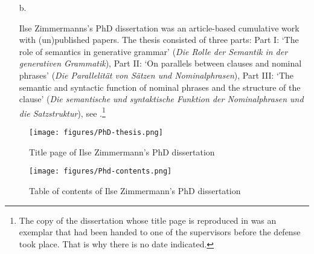 \documentclass[output=paper,colorlinks,citecolor=brown]{langscibook}
\begin{document}
{\begin{enumerate}[leftmargin=*]
\item[b.] 

\noindent Ilse Zimmermanns's PhD dissertation was an article-based cumulative work with (un)published papers. The thesis consisted of three parts: Part I: ‘The role of semantics in generative grammar’ (\textit{Die Rolle der Semantik in der generativen Grammatik}), Part II: ‘On parallels between clauses and nominal phrases’ (\textit{Die Parallelität von Sätzen und Nominalphrasen}), Part III: ‘The semantic and syntactic function of nominal phrases and the structure of the clause’ (\textit{Die semantische und syntaktische Funktion der Nominalphrasen und die Satzstruktur}), see .\footnote{The copy of the dissertation whose title page is reproduced in  was an exemplar that had been handed to one of the supervisors before the defense took place. That is why there is no date indicated.
}

\end{enumerate}

\begin{figure}
    \centering
    \texttt{[image: figures/PhD-thesis.png]}
    \caption{Title page of Ilse Zimmermann's PhD dissertation}
    \label{phd-thesis}
\end{figure}

\begin{figure}
    \centering
    \texttt{[image: figures/Phd-contents.png]}
    \caption{Table of contents of Ilse Zimmermann's PhD dissertation}
    \label{phd-thesis-contents}
\end{figure}


\begin{enumerate}[leftmargin=*]

\item[]  

\end{enumerate}


\begin{enumerate}[leftmargin=*]

\item[] 

\end{enumerate}


\begin{enumerate}[leftmargin=*]


\end{enumerate}}
\end{document}
